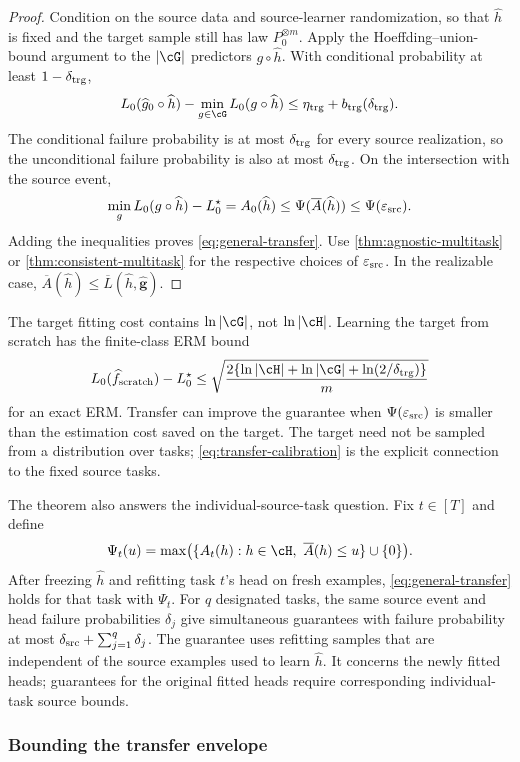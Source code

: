 \documentclass[11pt,twoside]{article}
\theoremstyle{definition}
\theoremstyle{remark}
\begin{document}
\begin{proof}
Condition on the source data and source-learner randomization, so that
$\widehat h$ is fixed and the target
sample still has law $P_0^{\otimes m}$. Apply the Hoeffding--union-bound
argument to the $|\cG|$ predictors $g\circ\widehat h$. With conditional
probability at least $1-\delta_{\rm trg}$,
\[
 L_0(\widehat g_0\circ\widehat h)
 -\min_{g\in\cG}L_0(g\circ\widehat h)
 \le\eta_{\rm trg}+b_{\rm trg}(\delta_{\rm trg}).
\]
The conditional failure probability is at most $\delta_{\rm trg}$ for every source
realization, so the unconditional failure probability is also at most
$\delta_{\rm trg}$. On the intersection with the source event,
\[
 \min_gL_0(g\circ\widehat h)-L_0^\star
 =A_0(\widehat h)
 \le\Psi(\overline A(\widehat h))
 \le\Psi(\varepsilon_{\rm src}).
\]
Adding the inequalities proves \cref{eq:general-transfer}.
Use \cref{thm:agnostic-multitask} or
\cref{thm:consistent-multitask} for the respective choices of
$\varepsilon_{\rm src}$. In the realizable case,
$\overline A(\widehat h)\le
\overline L(\widehat h,\widehat{\boldsymbol g})$.
\end{proof}

The target fitting cost contains $\ln|\cG|$, not $\ln|\cH|$.
Learning the target from scratch has the finite-class ERM bound
\[
 L_0(\widehat f_{\rm scratch})-L_0^\star
 \le \sqrt{
 \frac{2\{\ln|\cH|+\ln|\cG|+\ln(2/\delta_{\rm trg})\}}m}
\]
for an exact ERM. Transfer can improve the guarantee when
$\Psi(\varepsilon_{\rm src})$ is smaller than the estimation cost saved on the
target. The target need not be sampled from a distribution over tasks;
\cref{eq:transfer-calibration} is the explicit connection to the fixed
source tasks.

The theorem also answers the individual-source-task question. Fix
$t\in[T]$ and define
\[
 \Psi_t(u)
 =\max\bigl(\{A_t(h):h\in\cH,\ \overline A(h)\le u\}\cup\{0\}\bigr).
\]
After freezing $\widehat h$ and refitting task $t$'s head on fresh examples,
\cref{eq:general-transfer} holds for that task with $\Psi_t$.
For $q$ designated tasks, the same source event and head failure
probabilities $\delta_j$ give simultaneous guarantees with failure
probability at most $\delta_{\rm src}+\sum_{j=1}^q\delta_j$.
The guarantee uses refitting samples that are independent of the source
examples used to learn $\widehat h$. It concerns the newly fitted heads;
guarantees for the original fitted heads require corresponding
individual-task source bounds.

\subsubsection{Bounding the transfer envelope}
\label{sec:calibration-examples}
\end{document}
